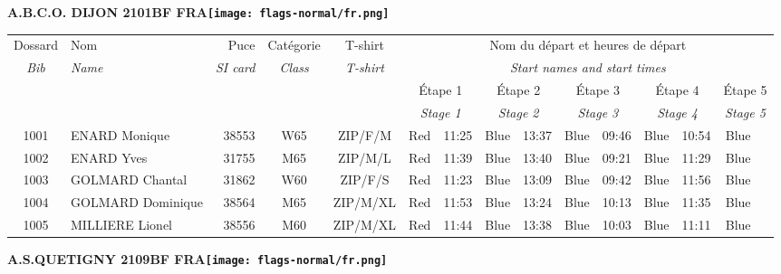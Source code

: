 \documentclass{report}
\begin{document}
  \setlength\tabcolsep{2pt}
  \sffamily
  \Huge \centering \bfseries A.B.C.O. DIJON 2101BF FRA\normalfont \footnotesize \sffamily \hfill \texttt{[image: flags-normal/fr.png]} \newline 
  \begin{longtable}{|c|l|r|c|c|*{5}{cc|}}
    Dossard & Nom  & Puce    & Catégorie & T-shirt & \multicolumn{10}{c|}{Nom du départ et heures de départ} \\
    \itshape Bib     & \itshape Name & \itshape SI card & \itshape Class  & \itshape  T-shirt  & \multicolumn{10}{c|}{\itshape Start names and start times} \\
    \hline
    & & & & & \multicolumn{2}{c|}{Étape 1} & \multicolumn{2}{c|}{Étape 2} & \multicolumn{2}{c|}{Étape 3} & \multicolumn{2}{c|}{Étape 4} & \multicolumn{2}{c|}{Étape 5} \\
    & & & & & \multicolumn{2}{c|}{\itshape Stage 1} & \multicolumn{2}{c|}{\itshape Stage 2} & \multicolumn{2}{c|}{\itshape Stage 3} & \multicolumn{2}{c|}{\itshape Stage 4} & \multicolumn{2}{c|}{\itshape Stage 5} \\
    \hline
    1001 & ENARD Monique & 38553 & W65 & ZIP/F/M & Red & 11:25 & Blue & 13:37 & Blue & 09:46 & Blue & 10:54 & Blue &  \\
    1002 & ENARD Yves & 31755 & M65 & ZIP/M/L & Red & 11:39 & Blue & 13:40 & Blue & 09:21 & Blue & 11:29 & Blue &  \\
    1003 & GOLMARD Chantal & 31862 & W60 & ZIP/F/S & Red & 11:23 & Blue & 13:09 & Blue & 09:42 & Blue & 11:56 & Blue &  \\
    1004 & GOLMARD Dominique & 38564 & M65 & ZIP/M/XL & Red & 11:53 & Blue & 13:24 & Blue & 10:13 & Blue & 11:35 & Blue &  \\
    1005 & MILLIERE Lionel & 38556 & M60 & ZIP/M/XL & Red & 11:44 & Blue & 13:38 & Blue & 10:03 & Blue & 11:11 & Blue &  \\
  \end{longtable}
\newpage
  \Huge \centering \bfseries A.S.QUETIGNY 2109BF FRA\normalfont \footnotesize \sffamily \hfill \texttt{[image: flags-normal/fr.png]} \newline 
\end{document}
